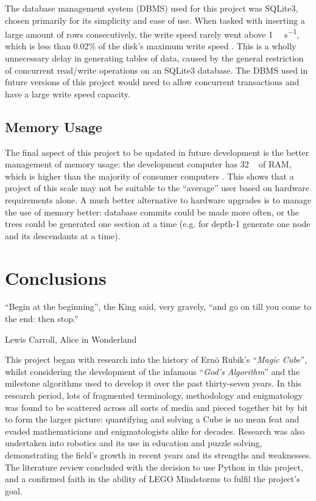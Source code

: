 \documentclass{report}
\newcommand{\tit}[1]{\textit{#1}}
\newcommand{\propernoun}[1]{\enquote{\tit{#1}}}
\newcommand{\depth}[1]{depth-#1}
\newcommand{\lego}{LEGO }
\begin{document}
	The database management system (DBMS) used for this project was SQLite3, chosen primarily for its simplicity and ease of use. When tasked with inserting a large amount of rows consecutively, the write speed rarely went above 1 \si{\mega\byte\per\second}, which is less than 0.02\% of the disk's maximum write speed \cite{Samsung2016}. This is a wholly unnecessary delay in generating tables of data, caused by the general restriction of concurrent read/write operations on an SQLite3 database. The DBMS used in future versions of this project would need to allow concurrent transactions and have a large write speed capacity.
	
	\section{Memory Usage}
	
	The final aspect of this project to be updated in future development is the better management of memory usage: the development computer has 32 \si{\giga\byte} of RAM, which is higher than the majority of consumer computers \cite{TechTalk2018, Steam2018}. This shows that a project of this scale may not be suitable to the \enquote{average} user based on hardware requirements alone. A much better alternative to hardware upgrades is to manage the use of memory better: database commits could be made more often, or the trees could be generated one section at a time (e.g. for \depth{1} generate one node and its descendants at a time).
	
    \newpage
    \chapter{Conclusions}
   	\epigraph{``Begin at the beginning'', the King said, very gravely, ``and go on till you come to the end: then stop.''}{Lewis Carroll, Alice in Wonderland \cite{Carroll1865}}
    
    This project began with research into the history of Ern\"{o} Rubik's \propernoun{Magic Cube}, whilst considering the development of the infamous \propernoun{God's Algorithm} and the milestone algorithms used to develop it over the past thirty-seven years. In this research period, lots of fragmented terminology, methodology and enigmatology was found to be scattered across all sorts of media and pieced together bit by bit to form the larger picture: quantifying and solving a Cube is no mean feat and evaded mathematicians and enigmatologists alike for decades. Research was also undertaken into robotics and its use in education and puzzle solving, demonstrating the field's growth in recent years and its strengths and weaknesses. The literature review concluded with the decision to use Python in this project, and a confirmed faith in the ability of \lego Mindstorms to fulfil the project's goal.
    
\end{document}
